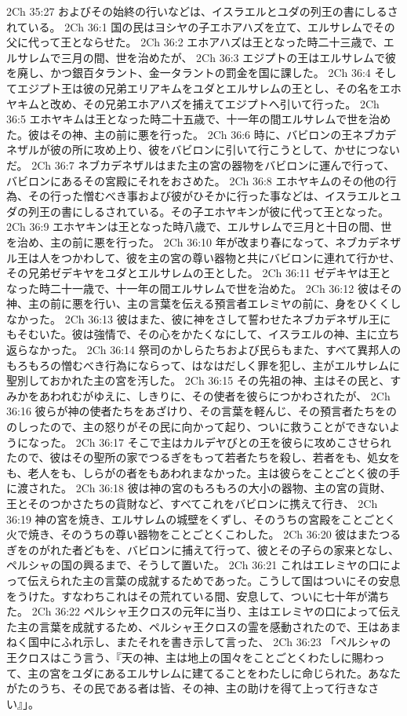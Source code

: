 2Ch 35:27  およびその始終の行いなどは、イスラエルとユダの列王の書にしるされている。
2Ch 36:1  国の民はヨシヤの子エホアハズを立て、エルサレムでその父に代って王とならせた。
2Ch 36:2  エホアハズは王となった時二十三歳で、エルサレムで三月の間、世を治めたが、
2Ch 36:3  エジプトの王はエルサレムで彼を廃し、かつ銀百タラント、金一タラントの罰金を国に課した。
2Ch 36:4  そしてエジプト王は彼の兄弟エリアキムをユダとエルサレムの王とし、その名をエホヤキムと改め、その兄弟エホアハズを捕えてエジプトへ引いて行った。
2Ch 36:5  エホヤキムは王となった時二十五歳で、十一年の間エルサレムで世を治めた。彼はその神、主の前に悪を行った。
2Ch 36:6  時に、バビロンの王ネブカデネザルが彼の所に攻め上り、彼をバビロンに引いて行こうとして、かせにつないだ。
2Ch 36:7  ネブカデネザルはまた主の宮の器物をバビロンに運んで行って、バビロンにあるその宮殿にそれをおさめた。
2Ch 36:8  エホヤキムのその他の行為、その行った憎むべき事および彼がひそかに行った事などは、イスラエルとユダの列王の書にしるされている。その子エホヤキンが彼に代って王となった。
2Ch 36:9  エホヤキンは王となった時八歳で、エルサレムで三月と十日の間、世を治め、主の前に悪を行った。
2Ch 36:10  年が改まり春になって、ネブカデネザル王は人をつかわして、彼を主の宮の尊い器物と共にバビロンに連れて行かせ、その兄弟ゼデキヤをユダとエルサレムの王とした。
2Ch 36:11  ゼデキヤは王となった時二十一歳で、十一年の間エルサレムで世を治めた。
2Ch 36:12  彼はその神、主の前に悪を行い、主の言葉を伝える預言者エレミヤの前に、身をひくくしなかった。
2Ch 36:13  彼はまた、彼に神をさして誓わせたネブカデネザル王にもそむいた。彼は強情で、その心をかたくなにして、イスラエルの神、主に立ち返らなかった。
2Ch 36:14  祭司のかしらたちおよび民らもまた、すべて異邦人のもろもろの憎むべき行為にならって、はなはだしく罪を犯し、主がエルサレムに聖別しておかれた主の宮を汚した。
2Ch 36:15  その先祖の神、主はその民と、すみかをあわれむがゆえに、しきりに、その使者を彼らにつかわされたが、
2Ch 36:16  彼らが神の使者たちをあざけり、その言葉を軽んじ、その預言者たちをののしったので、主の怒りがその民に向かって起り、ついに救うことができないようになった。
2Ch 36:17  そこで主はカルデヤびとの王を彼らに攻めこさせられたので、彼はその聖所の家でつるぎをもって若者たちを殺し、若者をも、処女をも、老人をも、しらがの者をもあわれまなかった。主は彼らをことごとく彼の手に渡された。
2Ch 36:18  彼は神の宮のもろもろの大小の器物、主の宮の貨財、王とそのつかさたちの貨財など、すべてこれをバビロンに携えて行き、
2Ch 36:19  神の宮を焼き、エルサレムの城壁をくずし、そのうちの宮殿をことごとく火で焼き、そのうちの尊い器物をことごとくこわした。
2Ch 36:20  彼はまたつるぎをのがれた者どもを、バビロンに捕えて行って、彼とその子らの家来となし、ペルシャの国の興るまで、そうして置いた。
2Ch 36:21  これはエレミヤの口によって伝えられた主の言葉の成就するためであった。こうして国はついにその安息をうけた。すなわちこれはその荒れている間、安息して、ついに七十年が満ちた。
2Ch 36:22  ペルシャ王クロスの元年に当り、主はエレミヤの口によって伝えた主の言葉を成就するため、ペルシャ王クロスの霊を感動されたので、王はあまねく国中にふれ示し、またそれを書き示して言った、
2Ch 36:23  「ペルシャの王クロスはこう言う、『天の神、主は地上の国々をことごとくわたしに賜わって、主の宮をユダにあるエルサレムに建てることをわたしに命じられた。あなたがたのうち、その民である者は皆、その神、主の助けを得て上って行きなさい』」。


